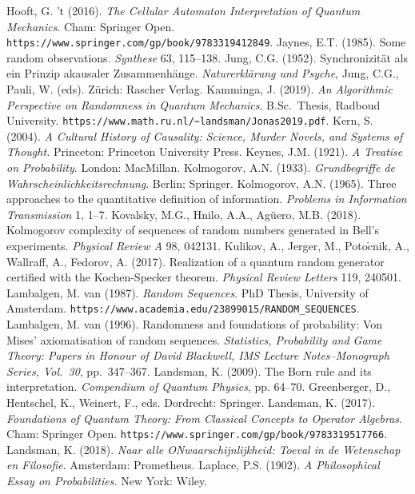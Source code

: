 \documentclass[11pt,a4paper]{article}
\numberwithin{equation}{section}
\begin{document}
\begin{small}
\begin{thebibliography}{99}
 \bibitem{}Hooft, G. 't (2016).
\emph{The Cellular Automaton Interpretation of Quantum Mechanics}. Cham: Springer Open. 
\verb#https://www.springer.com/gp/book/9783319412849#.
 \bibitem{} Jaynes, E.T. (1985). Some random observations. \emph{Synthese} 63, 115--138. 
 \bibitem{}  Jung, C.G. (1952). Synchronizit\"{a}t als ein Prinzip akausaler 
 Zusammenh\"{a}nge. \emph{Naturerkl\"{a}rung und Psyche}, 
 Jung, C.G., Pauli, W. (eds).  Z\"{u}rich: Rascher Verlag. 
   \bibitem{} Kamminga, J. (2019). \emph{An Algorithmic Perspective on Randomness in Quantum Mechanics}.
   B.Sc.\ Thesis, Radboud University. \verb#https://www.math.ru.nl/~landsman/Jonas2019.pdf#.
  \bibitem{} Kern, S. (2004). \emph{A Cultural History of Causality: Science, Murder Novels, and Systems of Thought.}
  Princeton: Princeton University Press. 
 \bibitem{} Keynes, J.M. (1921). \emph{A Treatise on Probability}. London: MacMillan. 
  \bibitem{} Kolmogorov, A.N. (1933). \emph{Grundbegriffe de Wahrscheinlichkeitsrechnung}. Berlin; Springer. 
    \bibitem{} Kolmogorov, A.N. (1965). Three approaches to the quantitative definition of information.
    \emph{Problems in Information Transmission} 1, 1--7. 
  \bibitem{}   Kovalsky, M.G.,  Hnilo, A.A., Ag\"{u}ero, M.B. (2018).  Kolmogorov complexity of sequences of random numbers generated in Bell's experiments. \emph{Physical Review A} 98, 042131.
  \bibitem{}   Kulikov, A.,  Jerger, M.,  Poto$\check{\mathrm{c}}$nik, A.,  Wallraff, A., Fedorov, A. (2017). Realization of a
    quantum random generator certified with the Kochen-Specker theorem. \emph{Physical Review Letters} 119, 240501.  
  \bibitem{} Lambalgen, M. van (1987). \emph{Random Sequences}. PhD Thesis, University of Amsterdam. \verb#https://www.academia.edu/23899015/RANDOM_SEQUENCES#.
    \bibitem{} Lambalgen, M. van (1996). Randomness and foundations of probability: Von Mises' axiomatisation of random sequences. \emph{Statistics, Probability and Game Theory: Papers in Honour of David Blackwell, IMS Lecture Notes--Monograph Series, Vol.\ 30}, pp.\ 347--367. 
   \bibitem{} Landsman, K. (2009). The Born rule and its interpretation.
  \emph{Compendium of Quantum Physics}, pp. 64--70.  Greenberger, D., Hentschel, K., Weinert, F., eds.  Dordrecht: Springer.
\bibitem{}   Landsman, K. (2017). \emph{Foundations of Quantum Theory: From Classical Concepts to Operator Algebras}. 
Cham: Springer Open. \verb#https://www.springer.com/gp/book/9783319517766#.
\bibitem{}   Landsman, K. (2018). \emph{Naar alle ONwaarschijnlijkheid: Toeval in de Wetenschap en Filosofie}. Amsterdam: Prometheus. 
\bibitem{} Laplace, P.S. (1902). \emph{A Philosophical Essay on Probabilities.} New York: Wiley. 

\end{thebibliography}
\end{small}
\end{document}
